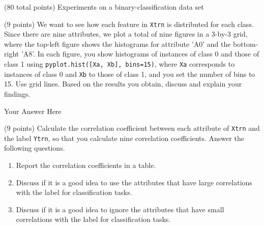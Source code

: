\documentclass[12pt]{article}
\begin{document}
\clearpage
%
%
\newcommand{\qOneTitle}{Experiments on a binary-classification data set}
%

  \begin{question}{(80 total points) \qOneTitle}




%
%
%
\medskip

\begin{subquestion}{(9 points)
    We want to see how each feature in {\tt Xtrn} is distributed for each class.
    Since there are nine attributes, we plot a total of nine figures in a 3-by-3 grid, where the top-left figure shows the histograms for attribute 'A0' and the bottom-right 'A8'.
    In each figure, you show histograms of instances of class 0 and those of class 1 using {\tt pyplot.hist([Xa, Xb], bins=15)}, where {\tt Xa} corresponds to instances of class 0 and {\tt Xb} to those of class 1, and you set the number of bins to 15. Use grid lines.
    Based on the results you obtain, discuss and explain your findings.
  } \label{Q1.1}


  \begin{answerbox}{0.78\textheight}
    Your Answer Here
  \end{answerbox}
  


\end{subquestion}

\begin{subquestion}{(9 points)
    Calculate the correlation coefficient between each attribute of {\tt Xtrn} and the label {\tt Ytrn}, so that you calculate nine correlation coefficients. Answer the following questions.
  }
  \begin{enumerate}\NARROWITEM
  \item Report the correlation coefficients in a table.
  \item Discuss if it is a good idea to use the attributes that have large
    correlations with the label for classification tasks.
  \item Discuss if it is a good idea to ignore the attributes that have small correlations with the label for classification tasks.
  \end{enumerate}



\end{subquestion}
\end{question}
\end{document}
